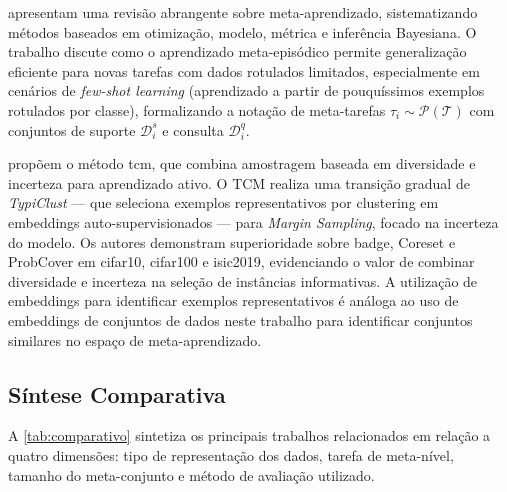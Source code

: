 apresentam uma revisão abrangente sobre meta-aprendizado, sistematizando métodos baseados em otimização, modelo, métrica e inferência Bayesiana. O trabalho discute como o aprendizado meta-episódico permite generalização eficiente para novas tarefas com dados rotulados limitados, especialmente em cenários de \textit{few-shot learning} (aprendizado a partir de pouquíssimos exemplos rotulados por classe), formalizando a notação de meta-tarefas $\tau_i \sim \mathcal{P}(\mathcal{T})$ com conjuntos de suporte $\mathcal{D}^s_i$ e consulta $\mathcal{D}^q_i$.

 propõem o método \gls{tcm}, que combina amostragem baseada em diversidade e incerteza para aprendizado ativo. O TCM realiza uma transição gradual de \textit{TypiClust} — que seleciona exemplos representativos por clustering em embeddings auto-supervisionados — para \textit{Margin Sampling}, focado na incerteza do modelo. Os autores demonstram superioridade sobre \gls{badge}, Coreset e ProbCover em \gls{cifar10}, \gls{cifar100} e \gls{isic2019}, evidenciando o valor de combinar diversidade e incerteza na seleção de instâncias informativas. A utilização de embeddings para identificar exemplos representativos é análoga ao uso de embeddings de conjuntos de dados neste trabalho para identificar conjuntos similares no espaço de meta-aprendizado.

\subsection{Síntese Comparativa}
\label{sec:sintese-comparativa}

A \autoref{tab:comparativo} sintetiza os principais trabalhos relacionados em relação a quatro dimensões: tipo de representação dos dados, tarefa de meta-nível, tamanho do meta-conjunto e método de avaliação utilizado.

